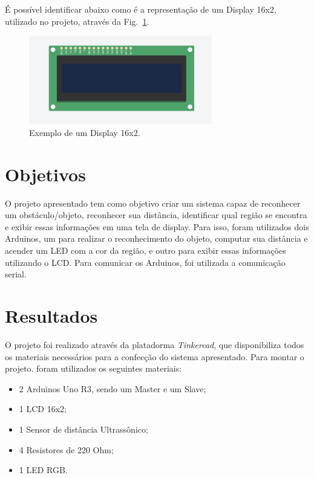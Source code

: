\documentclass[conference]{IEEEtran}
\begin{document}
É possível identificar abaixo como é a representação de um Display 16x2, utilizado no projeto, através
da Fig.~\ref{fig4}.

\begin{figure}[htbp]
    \centerline{
        \includegraphics[width=8cm]{imagens/Display.png}
        }
    \caption{Exemplo de um Display 16x2.}
    \label{fig4}
    \end{figure}

\section{Objetivos}

    O projeto apresentado tem como objetivo criar um sistema capaz de reconhecer um obstáculo/objeto,
reconhecer sua distância, identificar qual região se encontra e exibir essas informações em uma tela de 
display. Para isso, foram utilizados dois Arduinos, um para realizar o reconhecimento do objeto, computar
sua distância e acender um LED com a cor da região, e outro para exibir essas informações utilizando o
LCD. Para comunicar os Arduinos, foi utilizada a comunicação serial.

\section{Resultados}

    O projeto foi realizado através da platadorma \emph{Tinkercad}, que disponibiliza todos os materiais
necessários para a confecção do sistema apresentado. Para montar o projeto. foram utilizados os seguintes
materiais:
    \begin{itemize}
        \item 2 Arduinos Uno R3, sendo um Master e um Slave;
        \item 1 LCD 16x2;
        \item 1 Sensor de distância Ultrassônico;
        \item 4 Resistores de 220 Ohm;
        \item 1 LED RGB.
    \end{itemize}
\end{document}
